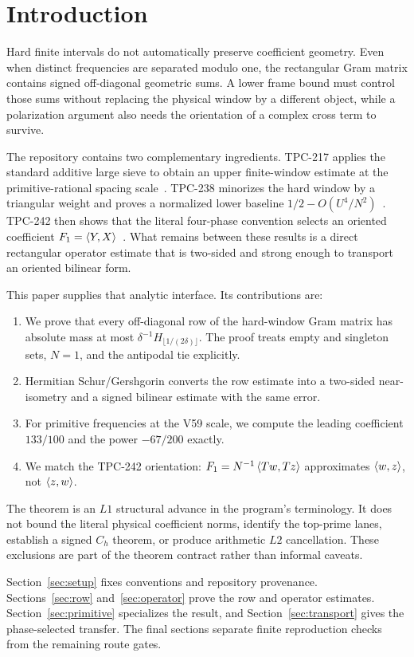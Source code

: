 \section{Introduction}

Hard finite intervals do not automatically preserve coefficient geometry.
Even when distinct frequencies are separated modulo one, the rectangular
Gram matrix contains signed off-diagonal geometric sums.  A lower frame bound
must control those sums without replacing the physical window by a different
object, while a polarization argument also needs the orientation of a complex
cross term to survive.

The repository contains two complementary ingredients.  TPC-217 applies the
standard additive large sieve to obtain an upper finite-window estimate at the
primitive-rational spacing scale~\cite{WangTPC217}.  TPC-238 minorizes the hard
window by a triangular weight and proves a normalized lower baseline
$1/2-O(U^4/N^2)$~\cite{WangTPC238}.  TPC-242 then shows that the literal
four-phase convention selects an oriented coefficient
$F_1=\left\langle Y,X\right\rangle$~\cite{WangTPC242}.  What remains between these results is a
direct rectangular operator estimate that is two-sided and strong enough to
transport an oriented bilinear form.

This paper supplies that analytic interface.  Its contributions are:
\begin{enumerate}
  \item We prove that every off-diagonal row of the hard-window Gram matrix has
  absolute mass at most
  $\delta^{-1}H_{\lfloor1/(2\delta)\rfloor}$.  The proof treats empty and
  singleton sets, $N=1$, and the antipodal tie explicitly.
  \item Hermitian Schur/Gershgorin converts the row estimate into a two-sided
  near-isometry and a signed bilinear estimate with the same error.
  \item For primitive frequencies at the V59 scale, we compute the leading
  coefficient $133/100$ and the power $-67/200$ exactly.
  \item We match the TPC-242 orientation:
  $F_1=N^{-1}\left\langle Tw,Tz\right\rangle$ approximates $\left\langle w,z\right\rangle$, not $\left\langle z,w\right\rangle$.
\end{enumerate}

The theorem is an $L1$ structural advance in the program's terminology.  It
does not bound the literal physical coefficient norms, identify the top-prime
lanes, establish a signed $C_h$ theorem, or produce arithmetic $L2$
cancellation.  These exclusions are part of the theorem contract rather than
informal caveats.

Section~\ref{sec:setup} fixes conventions and repository provenance.
Sections~\ref{sec:row} and~\ref{sec:operator} prove the row and operator
estimates.  Section~\ref{sec:primitive} specializes the result, and
Section~\ref{sec:transport} gives the phase-selected transfer.  The final
sections separate finite reproduction checks from the remaining route gates.
